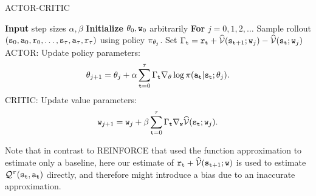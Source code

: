 \begin{algorithm}[H]
\caption{ACTOR-CRITIC}\label{alg:actor_critic}
\begin{algorithmic}[1]
\State \textbf{Input} step sizes $\alpha,\beta$
\State \textbf{Initialize} $\theta_0, {\tt w}_0$ arbitrarily
\State \textbf{For} $j = 0,1,2,\dots$
\State \quad Sample rollout $({\tt s}_0, {\tt a}_0, {\tt r}_0, \ldots, {\tt s}_\tau, {\tt a}_\tau, {\tt r}_\tau)$ using policy $\pi_{\theta_j}$.
\State \quad Set $\Gamma_{\tt t} = {\tt r}_{\tt t} + \widehat{\mathcal{V}}({\tt s}_{{\tt t}+1};{\tt w}_j) -\widehat{\mathcal{V}}({\tt s}_{\tt t};{\tt w}_j)$
\State \label{line:actor_update}\quad ACTOR: Update policy parameters:
\[
\theta_{j+1} = \theta_j + \alpha \sum_{{\tt t}=0}^{\tau} \Gamma_{\tt t} \nabla_\theta \log \pi({\tt a}_{\tt t} | {\tt s}_{\tt t}; \theta_j).
\]
\State \quad CRITIC: Update value parameters:
\[
{\tt w}_{j+1} = {\tt w}_j + \beta \sum_{{\tt t}=0}^{\tau} \Gamma_{\tt t} \nabla_{{\tt w}} \widehat{\mathcal{V}}({\tt s}_{\tt t};{\tt w}_j).
\]
\end{algorithmic}
\end{algorithm}




Note that in contrast to REINFORCE that used the function approximation to estimate only a baseline, here our estimate of  ${\tt r}_{{\tt t}} + \widehat{\mathcal{V}}({\tt s}_{{\tt t}+1};{\tt w})$ is used to estimate $\mathcal{Q}^\pi
({\tt s}_{{\tt t}},{\tt a}_{{\tt t}})$ directly, and therefore might introduce a bias due to an inaccurate approximation.


